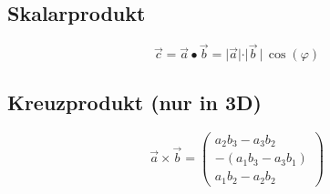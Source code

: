 		
		
		
		
	\subsection{Skalarprodukt}
	$$\vec{c} = \vec{a} \bullet \vec{b} = \vert \vec{a} \vert \cdot \vert \vec{b} \, \vert  \, \cos(\varphi)$$ 
		
		
		
		
		
	\subsection{Kreuzprodukt (nur in 3D)}
	 $$\vec{a} \times \vec{b} = \begin{pmatrix} a_2 b_3 - a_3 b_2 \\ -(a_1 b_3 - a_3 b_1) \\ a_1 b_2 - a_2 b_2 \end{pmatrix}$$ 
		
				
